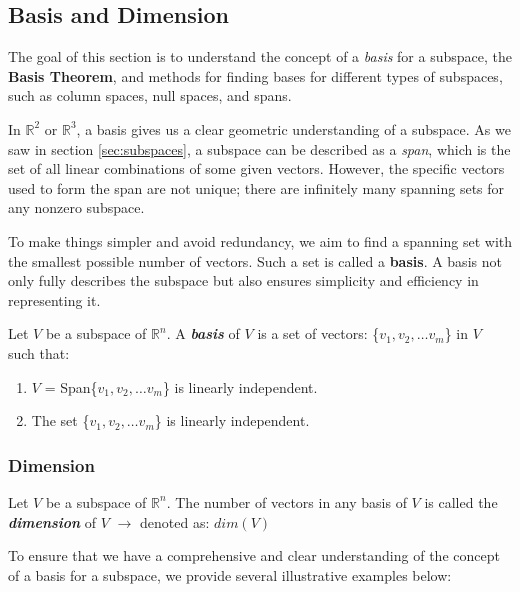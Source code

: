 \documentclass[a4paper,12pt]{article}
\begin{document}
\newpage

\subsection{Basis and Dimension}
The goal of this section is to understand the concept of a \textit{basis} for a subspace, the \textbf{Basis Theorem}, and methods for finding bases for different types of subspaces, such as column spaces, null spaces, and spans. 

In \( \mathbb{R}^2 \) or \( \mathbb{R}^3 \), a basis gives us a clear geometric understanding of a subspace. As we saw in section \ref{sec:subspaces}, a subspace can be described as a \textit{span}, which is the set of all linear combinations of some given vectors. However, the specific vectors used to form the span are not unique; there are infinitely many spanning sets for any nonzero subspace.

To make things simpler and avoid redundancy, we aim to find a spanning set with the smallest possible number of vectors. Such a set is called a \textbf{basis}. A basis not only fully describes the subspace but also ensures simplicity and efficiency in representing it.
\begin{tcolorbox}[title=Definition,colframe=blue!70!black, colback=blue!5!white]
    Let $V$ be a subspace of \(\mathbb{R}^n\). A \textbf{\textit{basis}} of $V$ is a set of vectors: \{$v_1,v_2,\dots v_m$\} in $V$ such that:
    \begin{enumerate}
        \item $V$ = Span\{$v_1,v_2,\dots v_m$\} is linearly independent.
        \item The set \{$v_1,v_2,\dots v_m$\} is linearly independent.
    \end{enumerate}
\end{tcolorbox}
\subsubsection{Dimension}


\begin{tcolorbox}[title=Definition,colframe=blue!70!black, colback=blue!5!white]
Let $V$ be a subspace of \(\mathbb{R}^n\). The number of vectors in any basis of $V$ is called the \textbf{\textit{dimension}} of $V$ $\rightarrow$ denoted as: $dim(V)$
\end{tcolorbox}

To ensure that we have a comprehensive and clear understanding of the concept of a basis for a subspace, we provide several illustrative examples below:
\end{document}
